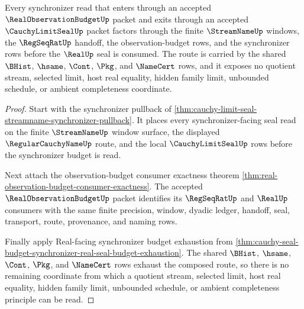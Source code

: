 \begin{theorem}
\label{thm:cauchy-limit-seal-synchronizer-observation-budget-route-exactness}
Every synchronizer read that enters through an accepted $\RealObservationBudgetUp$ packet and exits through an accepted $\CauchyLimitSealUp$ packet factors through the finite $\StreamNameUp$ windows, the $\RegSeqRatUp$ handoff, the observation-budget rows, and the synchronizer rows before the $\RealUp$ seal is consumed. The route is carried by the shared $\BHist$, $\hsame$, $\Cont$, $\Pkg$, and $\NameCert$ rows, and it exposes no quotient stream, selected limit, host real equality, hidden family limit, unbounded schedule, or ambient completeness coordinate.
\end{theorem}
\begin{proof}
Start with the synchronizer pullback of \autoref{thm:cauchy-limit-seal-streamname-synchronizer-pullback}. It places every synchronizer-facing seal read on the finite $\StreamNameUp$ window surface, the displayed $\RegularCauchyNameUp$ route, and the local $\CauchyLimitSealUp$ rows before the synchronizer budget is read.

Next attach the observation-budget consumer exactness theorem \autoref{thm:real-observation-budget-consumer-exactness}. The accepted $\RealObservationBudgetUp$ packet identifies its $\RegSeqRatUp$ and $\RealUp$ consumers with the same finite precision, window, dyadic ledger, handoff, seal, transport, route, provenance, and naming rows.

Finally apply Real-facing synchronizer budget exhaustion from \autoref{thm:cauchy-seal-budget-synchronizer-real-seal-budget-exhaustion}. The shared $\BHist$, $\hsame$, $\Cont$, $\Pkg$, and $\NameCert$ rows exhaust the composed route, so there is no remaining coordinate from which a quotient stream, selected limit, host real equality, hidden family limit, unbounded schedule, or ambient completeness principle can be read.
\end{proof}

